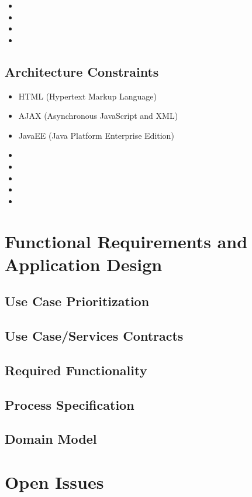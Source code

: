 \documentclass[a4paper]{article}
\begin{document}
\begin{itemize}
	\item 
	\item 
	\item 
	\item 
\end{itemize}

\subsection{Architecture Constraints}

\begin{itemize}
	\item HTML (Hypertext Markup Language)
	\item AJAX (Asynchronous JavaScript and XML)
	\item JavaEE (Java Platform Enterprise Edition)
	\item 
	\item 
	\item 
	\item 
	\item 
	
\end{itemize}

\section{Functional Requirements and Application Design}

\subsection{Use Case Prioritization}

\subsection{Use Case/Services Contracts}

\subsection{Required Functionality}
\subsection{Process Specification}
\subsection{Domain Model}


\section{Open Issues}
\end{document}
